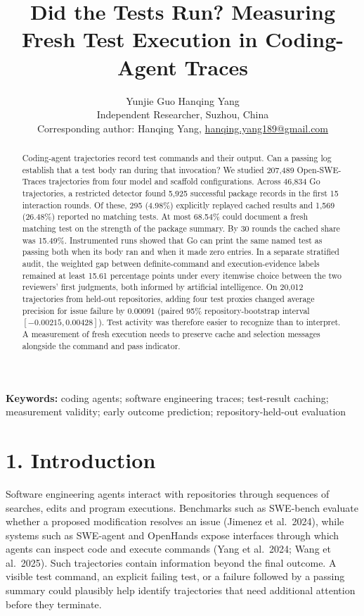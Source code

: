\documentclass[10pt,a4paper]{article}
\title{Did the Tests Run? Measuring Fresh Test Execution in Coding-Agent Traces}
\author{Yunjie Guo \quad Hanqing Yang\\[4pt]
\small Independent Researcher, Suzhou, China\\
\small Corresponding author: Hanqing Yang, \href{mailto:hanqing.yang189@gmail.com}{hanqing.yang189@gmail.com}}
\date{}
\begin{document}
\maketitle
\begin{abstract}
Coding-agent trajectories record test commands and their output. Can a passing log establish that a test body ran during that invocation? We studied 207,489 Open-SWE-Traces trajectories from four model and scaffold configurations. Across 46,834 Go trajectories, a restricted detector found 5,925 successful package records in the first 15 interaction rounds. Of these, 295 (4.98\%) explicitly replayed cached results and 1,569 (26.48\%) reported no matching tests. At most 68.54\% could document a fresh matching test on the strength of the package summary. By 30 rounds the cached share was 15.49\%. Instrumented runs showed that Go can print the same named test as passing both when its body ran and when it made zero entries. In a separate stratified audit, the weighted gap between definite-command and execution-evidence labels remained at least 15.61 percentage points under every itemwise choice between the two reviewers' first judgments, both informed by artificial intelligence. On 20,012 trajectories from held-out repositories, adding four test proxies changed average precision for issue failure by 0.00091 (paired 95\% repository-bootstrap interval $[-0.00215, 0.00428]$). Test activity was therefore easier to recognize than to interpret. A measurement of fresh execution needs to preserve cache and selection messages alongside the command and pass indicator.
\end{abstract}

\textbf{Keywords:} coding agents; software engineering traces; test-result caching; measurement validity; early outcome prediction; repository-held-out evaluation

\section{1. Introduction}
Software engineering agents interact with repositories through sequences of searches, edits and program executions. Benchmarks such as SWE-bench evaluate whether a proposed modification resolves an issue (Jimenez et al.\ 2024), while systems such as SWE-agent and OpenHands expose interfaces through which agents can inspect code and execute commands (Yang et al.\ 2024; Wang et al.\ 2025). Such trajectories contain information beyond the final outcome. A visible test command, an explicit failing test, or a failure followed by a passing summary could plausibly help identify trajectories that need additional attention before they terminate.
\end{document}
